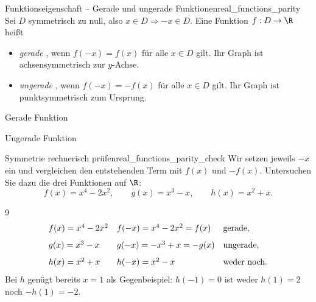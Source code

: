 \begin{center}
\end{center}

\par\noindent\begin{minipage}{\linewidth}
\begin{DefinitionBox}{Funktionseigenschaft -- Gerade und ungerade Funktionen}{real_functions_parity}
  Sei $D$ symmetrisch zu null, also $x\in D\Rightarrow -x\in D$.
  Eine Funktion $f:D\to\R$ heißt
  \begin{itemize}
    \item \emph{gerade} , wenn
      $f(-x)=f(x)$ für alle $x\in D$ gilt.
      Ihr Graph ist achsensymmetrisch zur $y$-Achse.
    \item \emph{ungerade} , wenn
      $f(-x)=-f(x)$ für alle $x\in D$ gilt.
      Ihr Graph ist punktsymmetrisch zum Ursprung.
  \end{itemize}
  \par\smallskip
  \begin{minipage}[t]{0.49\linewidth}
    \centering
    \textcolor{THMBlue}{Gerade Funktion}
    \par\smallskip
  \end{minipage}\hfill
  \begin{minipage}[t]{0.49\linewidth}
    \centering
    \textcolor{THMBlue}{Ungerade Funktion}
    \par\smallskip
  \end{minipage}
\end{DefinitionBox}
\begin{ExampleBox}[before skip=0.3\baselineskip]{Symmetrie rechnerisch prüfen}{real_functions_parity_check}
  Wir setzen jeweils $-x$ ein und vergleichen den entstehenden Term mit
  $f(x)$ und $-f(x)$.
  Untersuchen Sie dazu die drei Funktionen auf $\R$:
  \[
    f(x)=x^4-2x^2,\qquad g(x)=x^3-x,\qquad h(x)=x^2+x.
  \]
  \begin{ClozeArea}[34]{9}
    \[
      \begin{array}{l@{\quad}l@{\quad}l}
        f(x)=x^4-2x^2&
        f(-x)=x^4-2x^2=f(x)&\text{gerade},\\[0.8em]
        g(x)=x^3-x&
        g(-x)=-x^3+x=-g(x)&\text{ungerade},\\[0.8em]
        h(x)=x^2+x&
        h(-x)=x^2-x&\text{weder noch}.
      \end{array}
    \]
    Bei $h$ genügt bereits $x=1$ als Gegenbeispiel:
    $h(-1)=0$ ist weder $h(1)=2$ noch $-h(1)=-2$.
  \end{ClozeArea}
\end{ExampleBox}
\end{minipage}


